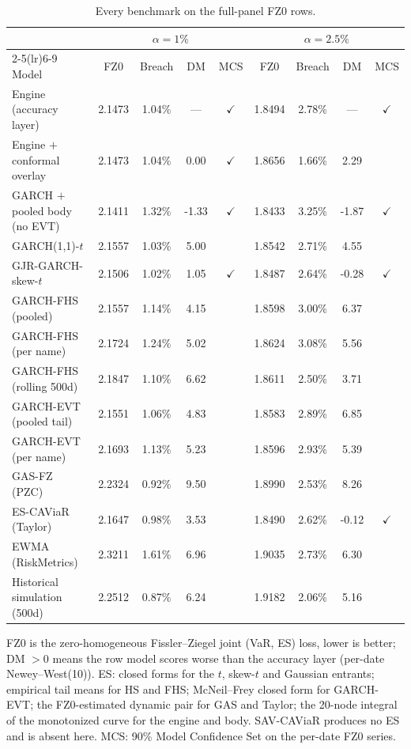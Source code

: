 \documentclass[11pt]{article}
\begin{document}
\begin{table}[htbp]
\centering
\begin{threeparttable}
\caption{Every benchmark on the full-panel FZ0 rows.}
\label{tab:bench-fz0}
\footnotesize
\begin{tabular}{lcccccccc}
\toprule
& \multicolumn{4}{c}{$\alpha=1\%$} & \multicolumn{4}{c}{$\alpha=2.5\%$} \\
\cmidrule(lr){2-5}\cmidrule(lr){6-9}
Model & FZ0 & Breach & DM & MCS & FZ0 & Breach & DM & MCS \\
\midrule
Engine (accuracy layer) & 2.1473 & 1.04\% & --- & $\checkmark$ & 1.8494 & 2.78\% & --- & $\checkmark$ \\
Engine $+$ conformal overlay & 2.1473 & 1.04\% & 0.00 & $\checkmark$ & 1.8656 & 1.66\% & 2.29 &  \\
GARCH $+$ pooled body (no EVT) & 2.1411 & 1.32\% & -1.33 & $\checkmark$ & 1.8433 & 3.25\% & -1.87 & $\checkmark$ \\
GARCH(1,1)-$t$ & 2.1557 & 1.03\% & 5.00 &  & 1.8542 & 2.71\% & 4.55 &  \\
GJR-GARCH-skew-$t$ & 2.1506 & 1.02\% & 1.05 & $\checkmark$ & 1.8487 & 2.64\% & -0.28 & $\checkmark$ \\
GARCH-FHS (pooled) & 2.1557 & 1.14\% & 4.15 &  & 1.8598 & 3.00\% & 6.37 &  \\
GARCH-FHS (per name) & 2.1724 & 1.24\% & 5.02 &  & 1.8624 & 3.08\% & 5.56 &  \\
GARCH-FHS (rolling 500d) & 2.1847 & 1.10\% & 6.62 &  & 1.8611 & 2.50\% & 3.71 &  \\
GARCH-EVT (pooled tail) & 2.1551 & 1.06\% & 4.83 &  & 1.8583 & 2.89\% & 6.85 &  \\
GARCH-EVT (per name) & 2.1693 & 1.13\% & 5.23 &  & 1.8596 & 2.93\% & 5.39 &  \\
GAS-FZ (PZC) & 2.2324 & 0.92\% & 9.50 &  & 1.8990 & 2.53\% & 8.26 &  \\
ES-CAViaR (Taylor) & 2.1647 & 0.98\% & 3.53 &  & 1.8490 & 2.62\% & -0.12 & $\checkmark$ \\
EWMA (RiskMetrics) & 2.3211 & 1.61\% & 6.96 &  & 1.9035 & 2.73\% & 6.30 &  \\
Historical simulation (500d) & 2.2512 & 0.87\% & 6.24 &  & 1.9182 & 2.06\% & 5.16 &  \\
\bottomrule
\end{tabular}
\begin{tablenotes}\footnotesize
\item FZ0 is the zero-homogeneous Fissler--Ziegel joint (VaR, ES) loss, lower is better; DM $>0$ means the row model scores worse than the accuracy layer (per-date Newey--West(10)). ES: closed forms for the $t$, skew-$t$ and Gaussian entrants; empirical tail means for HS and FHS; McNeil--Frey closed form for GARCH-EVT; the FZ0-estimated dynamic pair for GAS and Taylor; the 20-node integral of the monotonized curve for the engine and body. SAV-CAViaR produces no ES and is absent here. MCS: 90\% Model Confidence Set on the per-date FZ0 series.
\end{tablenotes}
\end{threeparttable}
\end{table}
\end{document}
